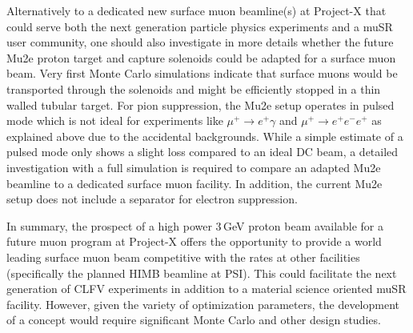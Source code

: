 Alternatively to a dedicated new surface muon beamline(s) at Project-X that could serve both the next generation particle physics experiments and a muSR user community, one should also investigate in more details whether the future Mu2e proton target and capture solenoids could be adapted for a surface muon beam. Very first Monte Carlo simulations indicate that surface muons would be transported through the solenoids and might be efficiently stopped in a thin walled tubular target. For pion suppression, the Mu2e setup operates in pulsed mode which is not ideal for experiments like $\mu^+ \to e^+\gamma$ and $\mu^+ \to e^+e^-e^+$ as explained above due to the accidental backgrounds. While a simple estimate of a pulsed mode only shows a slight loss compared to an ideal DC beam, a detailed investigation with a full simulation is required to compare an adapted Mu2e beamline to a dedicated surface muon facility. In addition, the current Mu2e setup does not include a separator for electron suppression.

In summary, the prospect of a high power 3\,GeV proton beam available for a future muon program at Project-X offers the opportunity to provide a world leading surface muon beam competitive with the rates at other facilities (specifically the planned HIMB beamline at PSI). This could facilitate the next generation of CLFV experiments in addition to a material science oriented muSR facility. However, given the variety of optimization parameters, the development of a concept would require significant Monte Carlo and other design studies.

%
